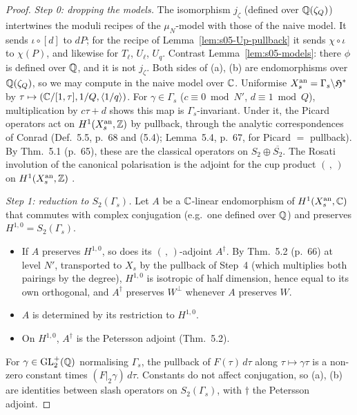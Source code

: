 \begin{proof}
\emph{Step 0: dropping the models.} The isomorphism $j_\zeta$ (defined over $\mathbb{Q}(\zeta_Q)$) intertwines the moduli recipes of the $\mu_N$-model with those of the
naive model. It sends $\iota\circ[d]$ to $dP$; for the recipe of Lemma~\ref{lem:s05-Up-pullback} it sends $\chi\circ\iota$ to $\chi(P)$, and likewise for
$T_\ell$, $U_\ell$, $U_q$. Contrast Lemma~\ref{lem:s05-models}: there $\phi$ is defined over $\mathbb{Q}$, and it is not $j_\zeta$.
Both sides of (a), (b) are endomorphisms over $\mathbb{Q}(\zeta_Q)$, so we may compute in the naive model over $\mathbb{C}$. Uniformise $X_s^{\rm an}=\Gamma_s\backslash\mathfrak H^*$ by
$\tau\mapsto(\mathbb{C}/[1,\tau],1/Q,\langle1/q\rangle)$. For $\gamma\in\Gamma_s$ ($c\equiv0\bmod N'$, $d\equiv1\bmod Q$), multiplication by $c\tau+d$ shows this map is
$\Gamma_s$-invariant. Under it, the Picard operators act on $H^1(X_s^{\rm an},\mathbb{Z})$ by pullback, through the analytic correspondences of Conrad
(Def.~5.5, p.~68 and (5.4); Lemma~5.4, p.~67, for Picard $=$ pullback). By Thm.~5.1 (p.~65), these are the classical operators on $S_2\oplus\overline{S_2}$.
The Rosati involution of the canonical polarisation is the adjoint for the cup product $(\,,\,)$ on $H^1(X_s^{\rm an},\mathbb{Z})$ \stknown.

\emph{Step 1: reduction to $S_2(\Gamma_s)$.} Let $A$ be a $\mathbb{C}$-linear endomorphism of $H^1(X_s^{\rm an},\mathbb{C})$ that commutes with complex conjugation (e.g.\ one defined over $\mathbb{Q}$) and preserves $H^{1,0}=S_2(\Gamma_s)$.
\begin{itemize}
\item If $A$ preserves $H^{1,0}$, so does its $(\,,\,)$-adjoint $A^\dagger$. By Thm.~5.2 (p.~66) at level $N'$, transported to $X_s$ by the pullback of Step~4 (which multiplies both pairings by the degree), $H^{1,0}$ is isotropic of half dimension, hence equal
  to its own orthogonal, and $A^\dagger$ preserves $W^\perp$ whenever $A$ preserves $W$.
\item $A$ is determined by its restriction to $H^{1,0}$.
\item On $H^{1,0}$, $A^\dagger$ is the Petersson adjoint (Thm.~5.2).
\end{itemize}
For $\gamma\in\mathrm{GL}_2^+(\mathbb{Q})$ normalising $\Gamma_s$, the pullback of $F(\tau)\,d\tau$ along $\tau\mapsto\gamma\tau$ is a non-zero constant times $(F|_2\gamma)\,d\tau$.
Constants do not affect conjugation, so (a), (b) are identities between slash operators on $S_2(\Gamma_s)$, with $\dagger$ the Petersson adjoint.


\end{proof}
